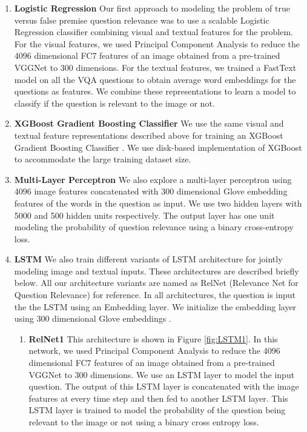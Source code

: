\begin{enumerate}
\item \textbf{Logistic Regression} Our first approach to modeling the problem of true versus false premise question relevance was to use a scalable Logistic Regression classifier combining visual and textual features for the problem. For the visual features, we used Principal Component Analysis to reduce the 4096 dimensional FC7 features of an image obtained from a pre-trained VGGNet to 300 dimensions. For the textual features, we trained a FastText model \cite{bojanowski2016enriching} on all the VQA questions to obtain average word embeddings for the questions as features. We combine these representations to learn a model to classify if the question is relevant to the image or not.
\item \textbf{XGBoost Gradient Boosting Classifier} We use the same visual and textual feature representations described above for training an XGBoost Gradient Boosting Classifier \cite{chen2016xgboost}. We use disk-based implementation of XGBoost to accommodate the large training dataset size.
\item \textbf{Multi-Layer Perceptron} We also explore a multi-layer perceptron using 4096 image features concatenated with 300 dimensional Glove embedding features of the words in the question as input. We use two hidden layers with 5000 and 500 hidden units respectively. The output layer has one unit modeling the probability of question relevance using a binary cross-entropy loss.
\item \textbf{LSTM} We also train different variants of LSTM architecture for jointly modeling image and textual inputs. These architectures are described briefly below. All our architecture variants are named as RelNet (Relevance Net for Question Relevance) for reference. In all architectures, the question is input the the LSTM using an Embedding layer. We initialize the embedding layer using 300 dimensional Glove embeddings \cite{pennington2014glove}.
\begin{enumerate}
\item \textbf{RelNet1} This architecture is shown in Figure \ref{fig:LSTM1}. In this network, we used Principal Component Analysis to reduce the 4096 dimensional FC7 features of an image obtained from a pre-trained VGGNet to 300 dimensions. We use an LSTM layer to model the input question. The output of this LSTM layer is concatenated with the image features at every time step and then fed to another LSTM layer. This LSTM layer is trained to model the probability of the question being relevant to the image or not using a binary cross entropy loss.

\end{enumerate}
\end{enumerate}
